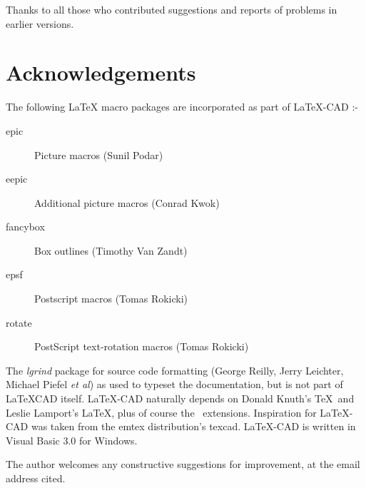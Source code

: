 \documentclass[a4paper]{article}
\begin{document}
Thanks to all those who contributed suggestions and reports of
problems in earlier versions.


\section{ Acknowledgements }
The following \LaTeX\/ macro packages are incorporated as part of
LaTeX-CAD :-
\begin{description}
    \item[epic] Picture macros (Sunil Podar)
    \item[eepic] Additional picture macros (Conrad Kwok)
    \item[fancybox] Box outlines (Timothy Van Zandt)
    \item[epsf] Postscript macros (Tomas Rokicki)
    \item[rotate] PostScript text-rotation macros (Tomas Rokicki)
\end{description}

The \textit{lgrind} package for source code formatting
(George Reilly, Jerry Leichter, Michael Piefel \textit{et al})
as used to typeset the documentation, but is not part of LaTeXCAD itself.
LaTeX-CAD naturally depends on Donald Knuth's \TeX\ and
Leslie Lamport's \LaTeX\/, plus of course the \LaTeXe\ extensions.
Inspiration for LaTeX-CAD was taken from the emtex distribution's texcad.
LaTeX-CAD is written in Visual Basic 3.0 for Windows.

The author welcomes any constructive suggestions for improvement,
at the email address cited.
\end{document}
